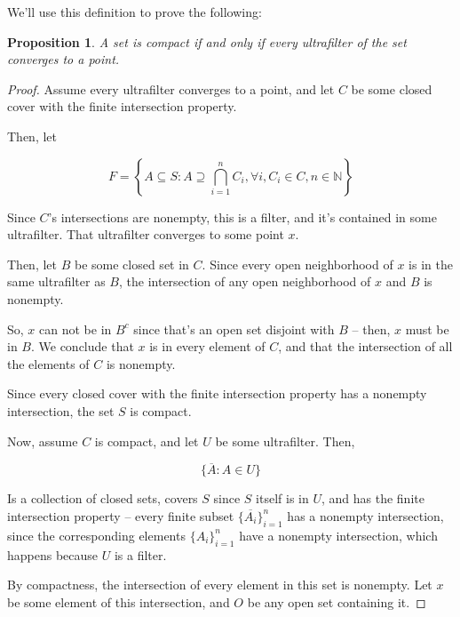 \documentclass{article}
\newtheorem*{proposition}{Proposition}
\begin{document}
        We'll use this definition to prove the following:

        \begin{proposition}
        A set is compact if and only if every ultrafilter of the
        set converges to a point.
        \end{proposition}

        \begin{proof}

          Assume every ultrafilter converges to a point, and let $C$ be some
          closed cover with the finite intersection property.

          Then, let

          \[F = \left\{A \subseteq S: A \supseteq \bigcap_{i=1}^n C_i, \forall
          i, C_i \in C, n
          \in \mathbb{N}\right\}\]

          Since $C$'s intersections are nonempty, this is a filter, and it's
          contained in some ultrafilter. That ultrafilter converges to some
          point $x$.

          Then, let $B$ be some closed set in $C$. Since every open neighborhood
          of $x$ is in the same ultrafilter as $B$, the intersection of any open
          neighborhood of $x$ and $B$ is nonempty.

          So, $x$ can not be in $B^c$ since that's an open set disjoint with
          $B$ -- then, $x$ must be in $B$. We conclude that $x$ is in every
          element of $C$, and that the intersection of all the elements of $C$
          is nonempty.

          Since every closed cover with the finite intersection property has a
          nonempty intersection, the set $S$ is compact.

          Now, assume $C$ is compact, and let $U$ be some ultrafilter. Then,

          \[\{\overline{A}: A \in U\}\]

          Is a collection of closed sets, covers $S$ since $S$ itself is in $U$,
          and has the finite intersection property -- every finite subset
          $\{\overline{A_i}\}_{i=1}^n$ has a nonempty intersection, since the
          corresponding elements $\{A_i\}_{i=1}^n$ have a nonempty intersection,
          which happens because $U$ is a filter.

          By compactness, the intersection of every element in this set is
          nonempty. Let $x$ be some element of this intersection, and $O$ be any
          open set containing it.


\end{proof}
\end{document}
